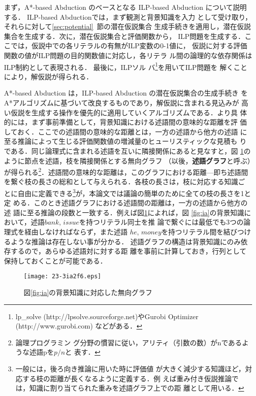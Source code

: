 \documentclass[japanese]{jnlp_1.4}
\begin{document}
まず，A*-based Abduction のベースとなる ILP-based Abduction
\cite{Inoue11b,Inoue12b} について説明する．
ILP-based Abductionでは，まず観測と背景知識を入力
として受け取り，それらに対して\ref{sec:potential}~節の潜在仮説集合
生成手続きを適用し，潜在仮説集合を生成する．次に，潜在仮説集合と評価関数から，
ILP問題を生成する．ここでは，仮説中での各リテラルの有無がILP変数の0-1値に，
仮説に対する評価関数の値がILP問題の目的関数値に対応し，各リテラ
ル間の論理的な依存関係はILP制約として表現される．
最後に，ILPソル
バ\footnote{lp\_solve (http://lpsolve.sourceforge.net)やGurobi
Optimizer (http://www.gurobi.com) などがある．}を用いてILP問題を
解くことにより，解仮説が得られる．

A*-based Abduction は，ILP-based Abduction の潜在仮説集合の生成手続き
をA*アルゴリズムに基づいて改良するものであり，解仮説に含まれる見込みが
高い仮説を生成する操作を優先的に適用していくアルゴリズムである．より具
体的には，まず事前準備として，背景知識における述語間の意味的な距離を評
価しておく．ここでの述語間の意味的な距離とは，一方の述語から他方の述語
に至る推論によって生じる評価関数値の増減量のヒューリスティックな見積も
りである．同じ論理式に含まれる述語を互いに隣接関係にあると見なすと，図
\ref{fig:heuristic1}のように節点を述語，枝を隣接関係とする無向グラフ
（以後，\textbf{述語グラフ}と呼ぶ）が得られる\footnote{論理プログラミン
グ分野の慣習に従い，アリティ（引数の数）がnであるような述語pを$p/n$と
表す．}．述語間の意味的な距離は，このグラフにおける距離—即ち述語間
を繋ぐ枝の長さの総和として与えられる．各枝の長さは，枝に対応する知識ご
とに自由に定義できる\footnote{一般には，後ろ向き推論に用いた時に評価値
が大きく減少する知識ほど，対応する枝の距離が長くなるように定義する．例
えば重み付き仮説推論では，知識に割り当てられた重みを述語グラフ上での距
離として用いる．}が，本論文では議論の簡単のために全ての枝の長さを1と定
める．このとき述語グラフにおける述語間の距離は，一方の述語から他方の述
語に至る推論の段数と一致する．例えば図\ref{fig:heuristic1}によれば，図
\ref{fig:ia}の背景知識において，述語$\mathit{bank}$, $\mathit{issue}$を持つリテラル同士を推
論で繋ぐには最低でも3つの論理式を経由しなければならず，また述語
$\mathit{he}$, $\mathit{money}$を持つリテラル間を結びつけるような推論は存在しない事が分かる．
述語グラフの構造は背景知識にのみ依存するので，あらゆる述語対に対する距
離を事前に計算しておき，行列として保持しておくことが可能である．

\begin{figure}[t]
\begin{center}
\texttt{[image: 23-3ia2f6.eps]}
\end{center}
\caption{図\ref{fig:ia}の背景知識に対応した無向グラフ}
\label{fig:heuristic1}
\end{figure}
\end{document}
